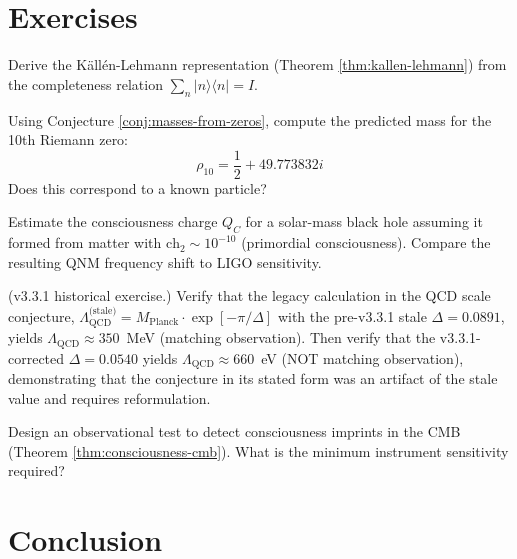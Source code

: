 \section{Exercises}

\begin{exercise}
Derive the Källén-Lehmann representation (Theorem \ref{thm:kallen-lehmann}) from the completeness relation $\sum_n |n\rangle\langle n| = I$.
\end{exercise}

\begin{exercise}
Using Conjecture \ref{conj:masses-from-zeros}, compute the predicted mass for the 10th Riemann zero:
\begin{equation}
\rho_{10} = \frac{1}{2} + 49.773832i
\end{equation}
Does this correspond to a known particle?
\end{exercise}

\begin{exercise}
Estimate the consciousness charge $Q_C$ for a solar-mass black hole assuming it formed from matter with $\text{ch}_2 \sim 10^{-10}$ (primordial consciousness). Compare the resulting QNM frequency shift to LIGO sensitivity.
\end{exercise}

\begin{exercise}
(v3.3.1 historical exercise.) Verify that the legacy calculation in the QCD scale conjecture, $\Lambda_{\text{QCD}}^{\text{(stale)}} = M_{\text{Planck}} \cdot \exp[-\pi/\Delta]$ with the pre-v3.3.1 stale $\Delta = 0.0891$, yields $\Lambda_{\text{QCD}} \approx 350$~MeV (matching observation). Then verify that the v3.3.1-corrected $\Delta = 0.0540$ yields $\Lambda_{\text{QCD}} \approx 660$~eV (NOT matching observation), demonstrating that the conjecture in its stated form was an artifact of the stale value and requires reformulation.
\end{exercise}

\begin{exercise}
Design an observational test to detect consciousness imprints in the CMB (Theorem \ref{thm:consciousness-cmb}). What is the minimum instrument sensitivity required?
\end{exercise}

\section{Conclusion}

